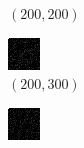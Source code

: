 \documentclass[a4paper, landscape]{article}
\begin{document}
\begin{figure}[H]
\begin{subfigure}{0.07\linewidth}
        \caption*{$(200, 200)$}
    \end{subfigure}
    \begin{subfigure}{0.07\linewidth}
        \centering
        \includegraphics[width=\linewidth]{omp/k = 200, m = 300.png}
        \caption*{$(200, 300)$}
    \end{subfigure}
    \begin{subfigure}{0.07\linewidth}
        \centering
        \includegraphics[width=\linewidth]{omp/k = 200, m = 400.png}

\end{subfigure}
\end{figure}
\end{document}
